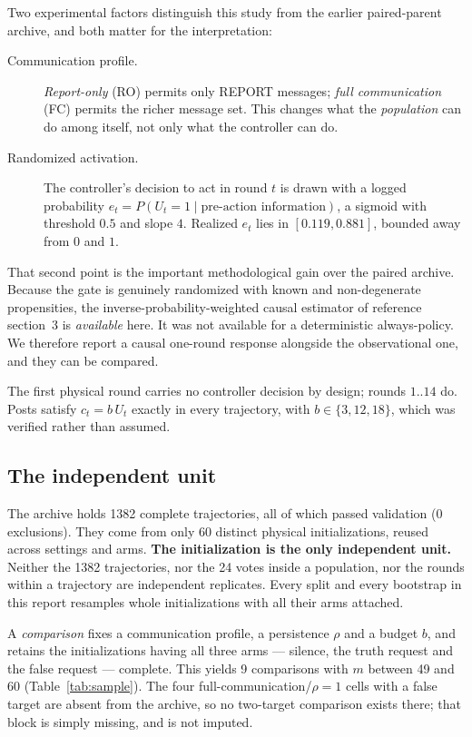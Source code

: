 \documentclass[11pt]{article}
\begin{document}
Two experimental factors distinguish this study from the earlier paired-parent archive, and
both matter for the interpretation:
\begin{description}
\item[Communication profile.] \emph{Report-only} (RO) permits only REPORT messages;
\emph{full communication} (FC) permits the richer message set. This changes what the
\emph{population} can do among itself, not only what the controller can do.
\item[Randomized activation.] The controller's decision to act in round $t$ is drawn with a
logged probability $e_t=P(U_t=1\mid\text{pre-action information})$, a sigmoid with threshold
$0.5$ and slope $4$. Realized $e_t$ lies in $[0.119,0.881]$, bounded away from $0$ and $1$.
\end{description}
That second point is the important methodological gain over the paired archive. Because the
gate is genuinely randomized with known and non-degenerate propensities, the
inverse-probability-weighted causal estimator of reference section~3 is \emph{available}
here. It was not available for a deterministic always-policy. We therefore report a causal
one-round response alongside the observational one, and they can be compared.

The first physical round carries no controller decision by design; rounds $1..14$ do. Posts
satisfy $c_t=b\,U_t$ exactly in every trajectory, with $b\in\{3,12,18\}$, which was verified
rather than assumed.

\subsection{The independent unit}
The archive holds 1382 complete trajectories, all of which passed validation
(0 exclusions). They come from only 60 distinct physical initializations,
reused across settings and arms. \textbf{The initialization is the only independent unit.}
Neither the 1382 trajectories, nor the 24 votes inside a population, nor the
rounds within a trajectory are independent replicates. Every split and every bootstrap in
this report resamples whole initializations with all their arms attached.

A \emph{comparison} fixes a communication profile, a persistence $\rho$ and a budget $b$,
and retains the initializations having all three arms --- silence, the truth request and the
false request --- complete. This yields 9 comparisons with $m$ between 49 and
60 (Table~\ref{tab:sample}). The four full-communication/$\rho{=}1$ cells with a false
target are absent from the archive, so no two-target comparison exists there; that block is
simply missing, and is not imputed.
\end{document}
